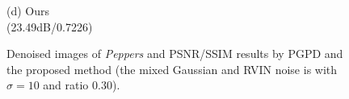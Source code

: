 \documentclass[runningheads]{llncs}
\begin{document}
\begin{figure}
{\begin{minipage}[t]{0.244\textwidth}
{\footnotesize (d) Ours \\(23.49dB/0.7226)}
\end{minipage}
}
\caption{Denoised images of \textsl{Peppers} and PSNR/SSIM results by PGPD and the proposed method (the mixed Gaussian and RVIN noise is with $\sigma = 10$ and ratio $0.30$).}
\label{fig32}
\end{figure}

\begin{figure}
\centering
{}
\end{figure}
\end{document}
